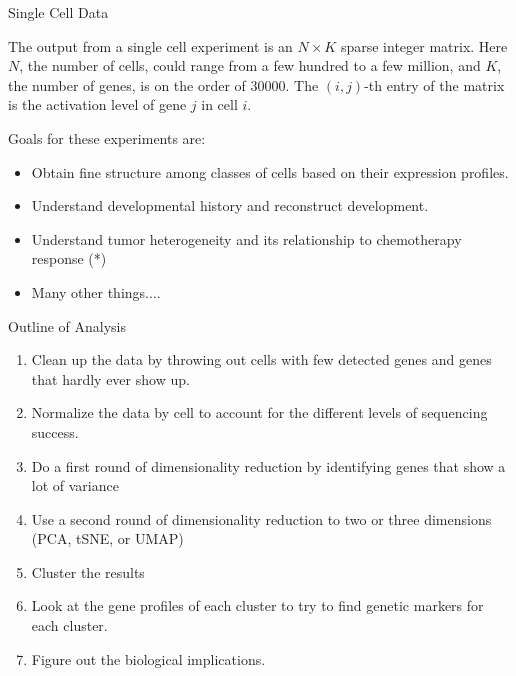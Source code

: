 \documentclass{beamer}
\begin{document}
\begin{frame}{Single Cell Data}
\begin{block}{}
  The output from a single cell experiment is an $N\times K$ sparse integer matrix.  Here $N$, the number of cells, could range from a few hundred to a few million, and $K$, the number of genes, is on the order of $30000$.  The $(i,j)$-th entry of the matrix is the activation level of gene $j$ in cell $i$.
\end{block}
\begin{block}{}
  Goals for these experiments are:
  \begin{itemize}
  \item Obtain fine structure among classes of cells based on their expression profiles.
  \item Understand developmental history and reconstruct development.
  \item Understand tumor heterogeneity and its relationship to chemotherapy response (*)
  \item Many other things....
  \end{itemize}
\end{block}
\end{frame}
\begin{frame}{Outline of Analysis}
  \begin{enumerate}
  \item Clean up the data by throwing out cells with few detected genes and genes that hardly ever show up.
  \item Normalize the data by cell to account for the different levels of sequencing success.
  \item Do a first round of dimensionality reduction by identifying genes that show a lot of variance
  \item Use a second round of dimensionality reduction to two or three dimensions (PCA, tSNE, or UMAP)
  \item Cluster the results
  \item Look at the gene profiles of each cluster to try to find genetic markers for each cluster.
  \item Figure out the biological implications.
  \end{enumerate}
  
  

  
\end{frame}
\end{document}

